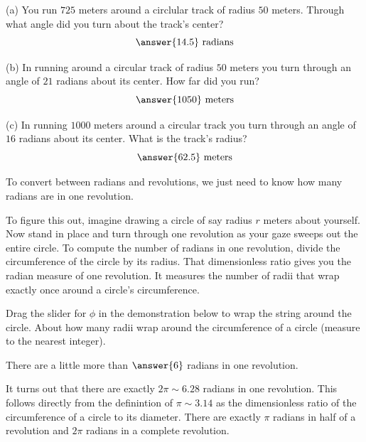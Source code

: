 \documentclass{ximera}
\begin{document}
\begin{question} \label{Q01:Radians}
(a) You run $725$ meters around a circlular track of radius $50$ meters. Through what angle did you turn about the track's center?
\[
    \answer{14.5} \text{ radians}
\]

(b) In running around a circular track of radius $50$ meters you turn through an angle of $21$ radians about its center. How far did you run?
\[
    \answer{1050} \text{ meters}
\]

(c) In running $1000$ meters around a circular track you turn through an angle of $16$ radians about its center. What is the track's radius?
\[
   \answer{62.5} \text{ meters}
\]

\end{question}



\begin{exploration}  \label{E33:Angles}
To convert between radians and revolutions, we just need to know how many radians are in one revolution.





To figure this out, imagine drawing a circle of say radius $r$ meters about yourself. Now stand in place and turn through one revolution as your gaze sweeps out the entire circle. To compute the number of radians in one revolution, divide the circumference of the circle by its radius. That dimensionless ratio gives you the radian measure of one revolution. It measures the number of radii that wrap exactly once around a circle's circumference.


\begin{question}
Drag the slider for $\phi$ in the demonstration below to wrap the string around the circle. About how many radii wrap around the circumference of a circle (measure to the nearest integer). 

There are a little more than $\answer{6}$ radians in one revolution.

\end{question}

It turns out that there are exactly $2\pi \sim 6.28$ radians in one revolution. This follows directly from the definintion of $\pi \sim 3.14$ as the dimensionless ratio of the circumference of a circle to its diameter. There are exactly $\pi$ radians in half of a revolution and $2\pi$ radians in a complete revolution.


 
\begin{onlineOnly}
    \begin{center}
\end{center}
\end{onlineOnly}
\end{exploration}
\end{document}
